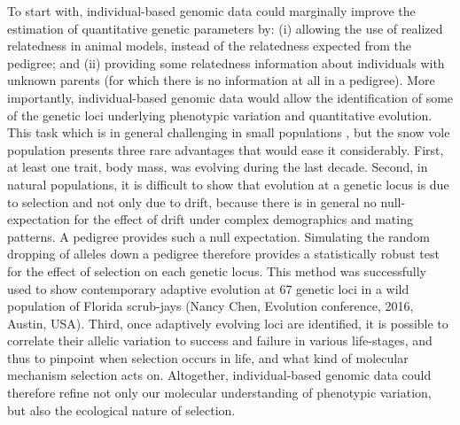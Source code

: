 To start with, individual-based genomic data could marginally improve the estimation of quantitative genetic parameters \parencite{Berenos2014} by: (i) allowing the use of realized relatedness in animal models, instead of the relatedness expected from the pedigree; and (ii) providing some relatedness information about individuals with unknown parents (for which there is no information at all in a pedigree). 
More importantly, individual-based genomic data would allow the identification of some of the genetic loci underlying phenotypic variation and quantitative evolution.
This task which is in general challenging in small populations \parencite{Wellenreuther2016}, but the snow vole population presents three rare advantages that would ease it considerably. First, at least one trait, body mass, was evolving during the last decade. 
Second, in natural populations, it is difficult to show that evolution at a genetic locus is due to selection and not only due to drift, because there is in general no null-expectation for the effect of drift under complex demographics and mating patterns. A pedigree provides such a null expectation. Simulating the random dropping of alleles down a pedigree therefore provides a statistically robust test for the effect of selection on each genetic locus. This method was successfully used to show contemporary adaptive evolution at 67 genetic loci in a wild population of Florida scrub-jays (Nancy Chen, Evolution conference, 2016, Austin, USA).
Third, once adaptively evolving loci are identified, it is possible to correlate their allelic variation to success and failure in various life-stages, and thus to pinpoint when selection occurs in life, and what kind of molecular mechanism selection acts on.
Altogether, individual-based genomic data could therefore refine not only our molecular understanding of phenotypic variation, but also the ecological nature of selection. 



